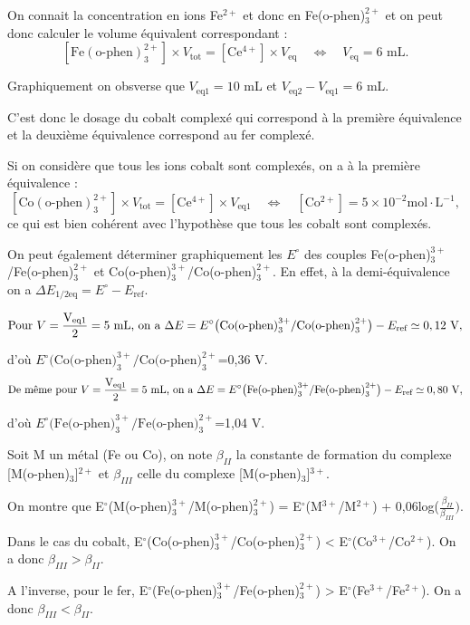 \begin{solution}
\begin{questions}
\question On connait la concentration en ions Fe$^{2+}$ et donc en Fe(o-phen)$_3^{2+}$ et on peut donc calculer le volume équivalent correspondant :
$$[\mathrm{Fe(\text{o-phen})_3^{2+}}] \times V_\text{tot} = [\mathrm{Ce^{4+}}] \times V_\text{eq} \quad \Longleftrightarrow \quad V_\text{eq} = 6 \text{ mL}.$$

Graphiquement on obsverse que $V_\text{eq1} = 10$ mL et $V_\text{eq2} - V_\text{eq1} = 6$ mL. 

C'est donc le dosage du cobalt complexé qui correspond à la première équivalence et la deuxième équivalence correspond au fer complexé.

\question Si on considère que tous les ions cobalt sont complexés, on a à la première équivalence :
$$[\mathrm{Co(\text{o-phen})_3^{2+}}] \times V_\text{tot} = [\mathrm{Ce^{4+}}] \times V_\text{eq1} \quad \Longleftrightarrow \quad [\mathrm{Co^{2+}}] = 5 \times 10^{-2} \mathrm{ mol\cdot L^{-1}},$$
ce qui est bien cohérent avec l'hypothèse que tous les cobalt sont complexés. 

On peut également déterminer graphiquement les $E^\circ$ des couples Fe(o-phen)$_3^{3+}$/Fe(o-phen)$_3^{2+}$ et Co(o-phen)$_3^{3+}$/Co(o-phen)$_3^{2+}$. En effet, à la demi-équivalence on a $\Delta E_{1/2\text{eq}}=E^\circ - E_\text{ref}$.

$$\text{Pour } V = \dfrac{\text{V}_\text{eq1}}{2} = 5 \text{ mL, on a } \Delta E  = E^\circ\qty\big(\text{Co(o-phen)}_3^{3+}/\text{Co(o-phen)}_3^{2+}) - E_\text{ref} \simeq 0,12 \text{ V},$$

d'où  $E^\circ(\text{Co(o-phen)}_3^{3+}/\text{Co(o-phen)}_3^{2+}$=0,36 V. 
$$\text{De même pour } V = \dfrac{\text{V}_\text{eq1}}{2} = 5 \text{ mL, on a } \Delta E  = E^\circ\qty\big(\text{Fe(o-phen)}_3^{3+}/\text{Fe(o-phen)}_3^{2+}) - E_\text{ref} \simeq 0,80 \text{ V},$$

d'où  $E^\circ(\text{Fe(o-phen)}_3^{3+}/\text{Fe(o-phen)}_3^{2+}$=1,04 V.

\question Soit M un métal (Fe ou Co), on note $\beta_{II}$ la constante de formation du complexe [M(o-phen)$_3$]$^{2+}$ et $\beta_{III}$ celle du complexe [M(o-phen)$_3$]$^{3+}$.

On montre que E$^\circ$(M(o-phen)$_3^{3+}$/M(o-phen)$_3^{2+}$) = E$^\circ$(M$^{3+}$/M$^{2+}$) + 0,06log($\frac{\beta_{II}}{\beta_{III}})$. 

Dans le cas du cobalt, E$^\circ$(Co(o-phen)$_3^{3+}$/Co(o-phen)$_3^{2+}$) < E$^\circ$(Co$^{3+}$/Co$^{2+}$). On a donc $\beta_{III} > \beta_{II}$. 

A l'inverse, pour le fer, E$^\circ$(Fe(o-phen)$_3^{3+}$/Fe(o-phen)$_3^{2+}$) > E$^\circ$(Fe$^{3+}$/Fe$^{2+}$). On a donc $\beta_{III} < \beta_{II}$.


\end{questions}
\end{solution}